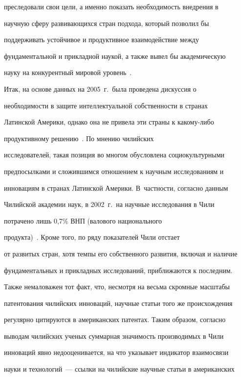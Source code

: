 преследовали свои цели, а именно показать необходимость внедрения в 


научную сферу развивающихся стран подхода, который позволил бы 


поддерживать устойчивое и продуктивное взаимодействие между 


фундаментальной и прикладной наукой, а также вывел бы академическую 


науку на конкурентный мировой уровень~\cite{17-koz}. 


     


     Итак, на основе данных на 2005~г.\ была проведена дискуссия о 


необходимости в защите интеллектуальной собственности в странах 


Латинской Америки, однако она не привела эти страны к какому-либо 


продуктивному решению~\cite{18-koz}. По мнению чилийских 


исследователей, такая позиция во многом обусловлена социокультурными 


предпосылками и сложившимся отношением к научным исследованиям и 


инновациям в странах Латинской Америки. В~частности, согласно данным 


Чилийской академии наук, в 2002~г.\ на научные исследования в Чили 


потрачено лишь 0,7\% ВНП (валового национального 


     продукта)~\cite{17-koz}. Кроме того, по ряду показателей Чили отстает 


от развитых стран, хотя темпы его собственного развития, включая и наличие 


фундаментальных и прикладных исследований, приближаются к последним. 


Также немаловажен тот факт, что, несмотря на весьма скромные масштабы 


патентования чилийских инноваций, научные статьи того же происхождения 


регулярно цитируются в американских патентах. Таким образом, согласно 


выводам чилийских ученых суммарная значимость производимых в Чили 


инноваций явно недооценивается, на что указывает индикатор взаимосвязи 


науки и технологий~--- ссылки на чилийские научные статьи в американских 


